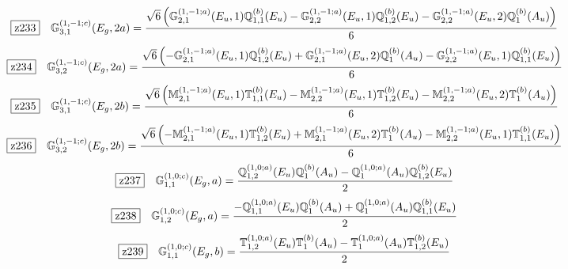 \documentclass[fleqn,10pt,landscape]{jsarticle}
\begin{document}
\begin{dmath*}
\hspace*{3mm}\fbox{z233}\quad \mathbb{G}_{3,1}^{(1,-1;c)}(E_{g},2a)=\frac{\sqrt{6} \left(\mathbb{G}_{2,1}^{(1,-1;a)}(E_{u},1) \mathbb{Q}_{1,1}^{(b)}(E_{u}) - \mathbb{G}_{2,2}^{(1,-1;a)}(E_{u},1) \mathbb{Q}_{1,2}^{(b)}(E_{u}) - \mathbb{G}_{2,2}^{(1,-1;a)}(E_{u},2) \mathbb{Q}_{1}^{(b)}(A_{u})\right)}{6}
\end{dmath*}
\begin{dmath*}
\hspace*{3mm}\fbox{z234}\quad \mathbb{G}_{3,2}^{(1,-1;c)}(E_{g},2a)=\frac{\sqrt{6} \left(- \mathbb{G}_{2,1}^{(1,-1;a)}(E_{u},1) \mathbb{Q}_{1,2}^{(b)}(E_{u}) + \mathbb{G}_{2,1}^{(1,-1;a)}(E_{u},2) \mathbb{Q}_{1}^{(b)}(A_{u}) - \mathbb{G}_{2,2}^{(1,-1;a)}(E_{u},1) \mathbb{Q}_{1,1}^{(b)}(E_{u})\right)}{6}
\end{dmath*}
\begin{dmath*}
\hspace*{3mm}\fbox{z235}\quad \mathbb{G}_{3,1}^{(1,-1;c)}(E_{g},2b)=\frac{\sqrt{6} \left(\mathbb{M}_{2,1}^{(1,-1;a)}(E_{u},1) \mathbb{T}_{1,1}^{(b)}(E_{u}) - \mathbb{M}_{2,2}^{(1,-1;a)}(E_{u},1) \mathbb{T}_{1,2}^{(b)}(E_{u}) - \mathbb{M}_{2,2}^{(1,-1;a)}(E_{u},2) \mathbb{T}_{1}^{(b)}(A_{u})\right)}{6}
\end{dmath*}
\begin{dmath*}
\hspace*{3mm}\fbox{z236}\quad \mathbb{G}_{3,2}^{(1,-1;c)}(E_{g},2b)=\frac{\sqrt{6} \left(- \mathbb{M}_{2,1}^{(1,-1;a)}(E_{u},1) \mathbb{T}_{1,2}^{(b)}(E_{u}) + \mathbb{M}_{2,1}^{(1,-1;a)}(E_{u},2) \mathbb{T}_{1}^{(b)}(A_{u}) - \mathbb{M}_{2,2}^{(1,-1;a)}(E_{u},1) \mathbb{T}_{1,1}^{(b)}(E_{u})\right)}{6}
\end{dmath*}
\begin{dmath*}
\hspace*{3mm}\fbox{z237}\quad \mathbb{G}_{1,1}^{(1,0;c)}(E_{g},a)=\frac{\mathbb{Q}_{1,2}^{(1,0;a)}(E_{u}) \mathbb{Q}_{1}^{(b)}(A_{u}) - \mathbb{Q}_{1}^{(1,0;a)}(A_{u}) \mathbb{Q}_{1,2}^{(b)}(E_{u})}{2}
\end{dmath*}
\begin{dmath*}
\hspace*{3mm}\fbox{z238}\quad \mathbb{G}_{1,2}^{(1,0;c)}(E_{g},a)=\frac{- \mathbb{Q}_{1,1}^{(1,0;a)}(E_{u}) \mathbb{Q}_{1}^{(b)}(A_{u}) + \mathbb{Q}_{1}^{(1,0;a)}(A_{u}) \mathbb{Q}_{1,1}^{(b)}(E_{u})}{2}
\end{dmath*}
\begin{dmath*}
\hspace*{3mm}\fbox{z239}\quad \mathbb{G}_{1,1}^{(1,0;c)}(E_{g},b)=\frac{\mathbb{T}_{1,2}^{(1,0;a)}(E_{u}) \mathbb{T}_{1}^{(b)}(A_{u}) - \mathbb{T}_{1}^{(1,0;a)}(A_{u}) \mathbb{T}_{1,2}^{(b)}(E_{u})}{2}
\end{dmath*}
\end{document}

